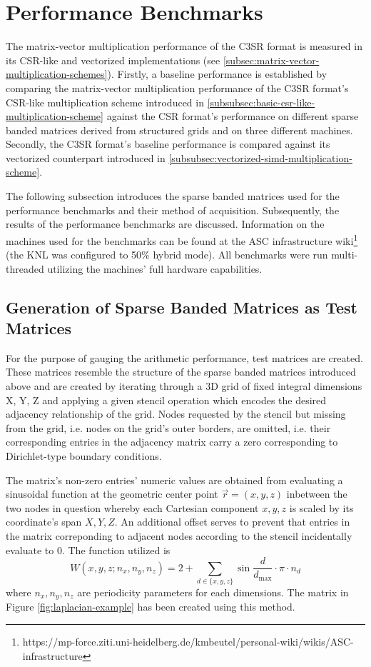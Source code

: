 \chapter{Performance Benchmarks}

  The matrix-vector multiplication performance of the C3SR format is measured in its CSR-like and vectorized implementations (see \ref{subsec:matrix-vector-multiplication-schemes}). Firstly, a baseline performance is established by comparing the matrix-vector multiplication performance of the C3SR format's CSR-like multiplication scheme introduced in \ref{subsubsec:basic-csr-like-multiplication-scheme} against the CSR format's performance on different sparse banded matrices derived from structured grids and on three different machines. Secondly, the C3SR format's baseline performance is compared against its vectorized counterpart introduced in \ref{subsubsec:vectorized-simd-multiplication-scheme}.

  The following subsection introduces the sparse banded matrices used for the performance benchmarks and their method of acquisition. Subsequently, the results of the performance benchmarks are discussed. Information on the machines used for the benchmarks can be found at the ASC infrastructure wiki\footnote{https://mp-force.ziti.uni-heidelberg.de/kmbeutel/personal-wiki/wikis/ASC-infrastructure} (the KNL was configured to 50\% hybrid mode). All benchmarks were run multi-threaded utilizing the machines' full hardware capabilities.

  \section{Generation of Sparse Banded Matrices as Test Matrices}

    For the purpose of gauging the arithmetic performance, test matrices are created. These matrices resemble the structure of the sparse banded matrices introduced above and are created by iterating through a 3D grid of fixed integral dimensions X, Y, Z and applying a given stencil operation which encodes the desired adjacency relationship of the grid. Nodes requested by the stencil but missing from the grid, i.e. nodes on the grid's outer borders, are omitted, i.e. their corresponding entries in the adjacency matrix carry a zero corresponding to Dirichlet-type boundary conditions.

    The matrix's non-zero entries' numeric values are obtained from evaluating a sinusoidal function at the geometric center point $\vec{r} = (x, y, z)$ inbetween the two nodes in question whereby each Cartesian component $x, y, z$ is scaled by its coordinate's span $X, Y, Z$. An additional offset serves to prevent that entries in the matrix correponding to adjacent nodes according to the stencil incidentally evaluate to 0. The function utilized is $$W(x,y,z; n_x, n_y, n_z) = 2 + \sum \limits_{d \in \{x,y,z\}} \sin{\frac{d}{d_{\text{max}}} \cdot \pi \cdot n_d} $$ where $n_x, n_y, n_z$ are periodicity parameters for each dimensions. The matrix in Figure \ref{fig:laplacian-example} has been created using this method.

